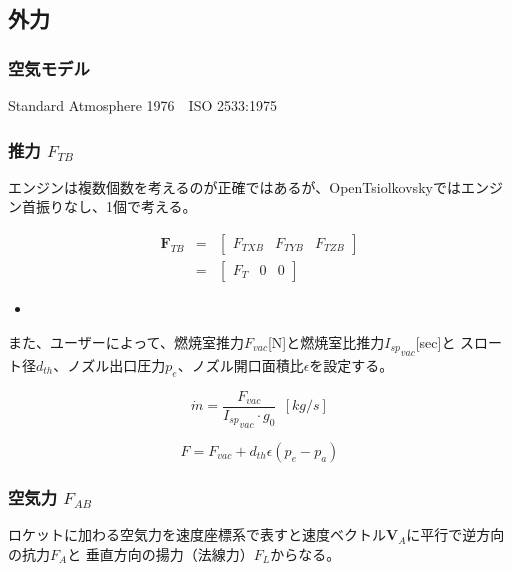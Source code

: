 \documentclass[12pt]{jsarticle}
\begin{document}
\subsection{外力}

\subsubsection{空気モデル}
Standard Atmosphere 1976　ISO 2533:1975


\subsubsection{推力 $F_{TB}$}
エンジンは複数個数を考えるのが正確ではあるが、OpenTsiolkovskyではエンジン首振りなし、1個で考える。

\begin{eqnarray}
  \bm{F}_{TB} &=& \left[
  \begin{array}{ccc}
    F_{TXB} & F_{TYB} & F_{TZB}
  \end{array}
  \right] \\
  &=& \left[
  \begin{array}{ccc}
    F_{T} & 0 & 0
  \end{array}
  \right]
\end{eqnarray}

\begin{itemize}
  \item
\end{itemize}

また、ユーザーによって、燃焼室推力$F_{vac}$[N]と燃焼室比推力${I_{sp}}_{vac}$[sec]と
スロート径$d_{th}$、ノズル出口圧力$p_e$、ノズル開口面積比$\epsilon$を設定する。


\begin{equation}
  \dot{m} = \frac{F_{vac}}{{I_{sp}}_{vac} \cdot g_0} \ \ [kg/s]
\end{equation}

\begin{equation}
  F = F_{vac} + d_{th} \epsilon \left( p_{e} - p_{a}\right)
\end{equation}
%

\subsubsection{空気力 $F_{AB}$}
ロケットに加わる空気力を速度座標系で表すと速度ベクトル$\bm{V}_A$に平行で逆方向の抗力$F_A$と
垂直方向の揚力（法線力）$F_L$からなる。
\end{document}
